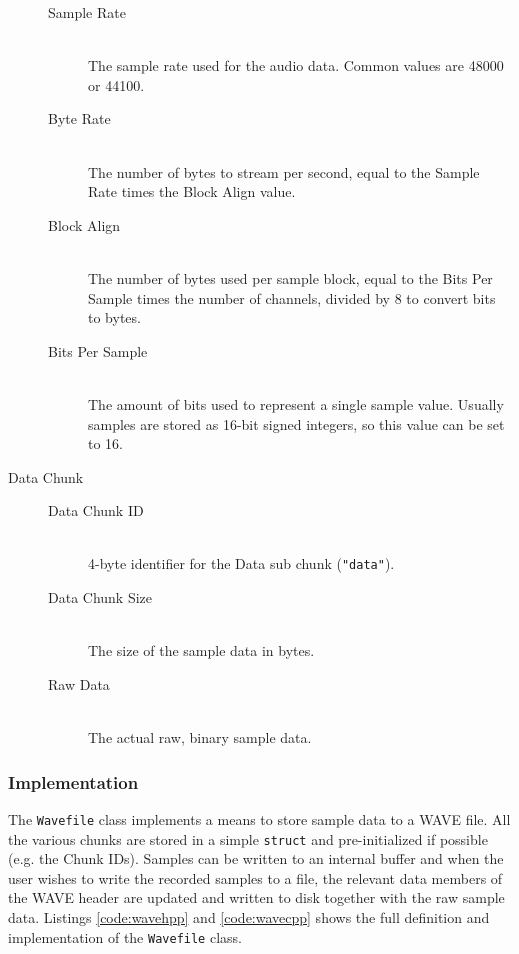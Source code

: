 \documentclass[12pt,twoside]{report}
\begin{document}
\begin{description}
\begin{description}
    \item[Sample Rate] \hfill \\ The sample rate used for the audio data. Common values are 48000 or 44100.

    \item[Byte Rate] \hfill \\ The number of bytes to stream per second, equal to the Sample Rate times the Block Align value.

    \item[Block Align] \hfill \\ The number of bytes used per sample block, equal to the Bits Per Sample times the number of channels, divided by 8 to convert bits to bytes.

    \item[Bits Per Sample] \hfill \\ The amount of bits used to represent a single sample value. Usually samples are stored as 16-bit signed integers, so this value can be set to 16.

  \end{description}

  \item[Data Chunk] \hfill

  \begin{description}

    \item[Data Chunk ID] \hfill \\ 4-byte identifier for the Data sub chunk (\texttt{"data"}).

    \item[Data Chunk Size] \hfill \\ The size of the sample data in bytes.

    \item[Raw Data] \hfill \\ The actual raw, binary sample data.

  \end{description}

\end{description}

\subsubsection{Implementation}

The \texttt{Wavefile} class implements a means to store sample data to a WAVE file. All the various chunks are stored in a simple \texttt{struct} and pre-initialized if possible (e.g. the Chunk IDs). Samples can be written to an internal buffer and when the user wishes to write the recorded samples to a file, the relevant data members of the WAVE header are updated and written to disk together with the raw sample data. Listings \ref{code:wavehpp} and \ref{code:wavecpp} shows the full definition and implementation of the \texttt{Wavefile} class.
\end{document}
